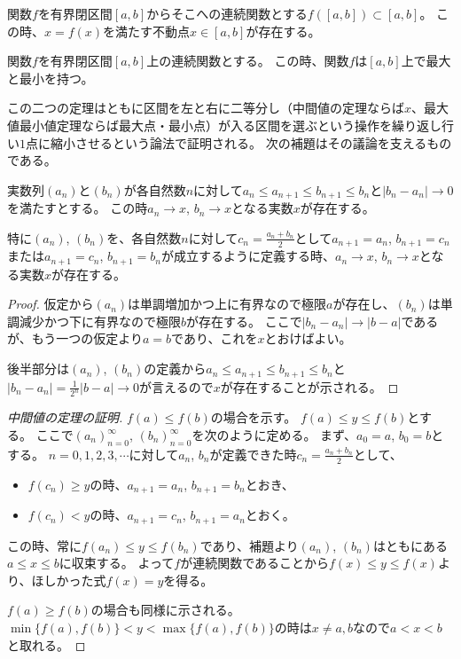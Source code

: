 \begin{corollary}[不動点型の中間値の定理]
関数$f$を有界閉区間$[a, b]$からそこへの連続関数とする$f([a, b]) \subset [a, b]$。
この時、$x = f(x)$を満たす不動点$x \in [a, b]$が存在する。
\end{corollary}

\begin{theorem}[最大値最小値定理]
関数$f$を有界閉区間$[a, b]$上の連続関数とする。
この時、関数$f$は$[a, b]$上で最大と最小を持つ。
\end{theorem}

この二つの定理はともに区間を左と右に二等分し（中間値の定理ならば$x$、最大値最小値定理ならば最大点・最小点）が入る区間を選ぶという操作を繰り返し行い$1$点に縮小させるという論法で証明される。
次の補題はその議論を支えるものである。

\begin{lemma}[区間縮小法]
実数列$(a_n)$と$(b_n)$が各自然数$n$に対して$a_n \le a_{n+1} \le b_{n+1} \le b_n$と$|b_n-a_n| \to 0$を満たすとする。
この時$a_n \to x$, $b_n \to x$となる実数$x$が存在する。

特に$(a_n)$, $(b_n)$を、各自然数$n$に対して$c_n = \frac{a_n+b_n}{2}$として$a_{n+1} = a_n$, $b_{n+1} = c_n$または$a_{n+1} = c_n$, $b_{n+1} = b_n$が成立するように定義する時、$a_n \to x$, $b_n \to x$となる実数$x$が存在する。
\end{lemma}

\begin{proof}
仮定から$(a_n)$は単調増加かつ上に有界なので極限$a$が存在し、$(b_n)$は単調減少かつ下に有界なので極限$b$が存在する。
ここで$|b_n-a_n| \to |b-a|$であるが、もう一つの仮定より$a = b$であり、これを$x$とおけばよい。

後半部分は$(a_n)$, $(b_n)$の定義から$a_n \le a_{n+1} \le b_{n+1} \le b_n$と$|b_n-a_n| = \frac{1}{2^n}|b-a| \to 0$が言えるので$x$が存在することが示される。
\end{proof}

\begin{proof}[中間値の定理の証明]
$f(a) \le f(b)$の場合を示す。
$f(a) \le y \le f(b)$とする。
ここで$(a_n)_{n = 0}^\infty$, $(b_n)_{n = 0}^\infty$を次のように定める。
まず、$a_0 = a$, $b_0 = b$とする。
$n = 0, 1, 2, 3, \cdots$に対して$a_n$, $b_n$が定義できた時$c_n = \frac{a_n+b_n}{2}$として、
\begin{itemize}
\item
$f(c_n) \ge y$の時、$a_{n+1} = a_n$, $b_{n+1} = b_n$とおき、
\item
$f(c_n) < y$の時、$a_{n+1} = c_n$, $b_{n+1} = a_n$とおく。
\end{itemize}
この時、常に$f(a_n) \le y \le f(b_n)$であり、補題より$(a_n)$, $(b_n)$はともにある$a \le x \le b$に収束する。
よって$f$が連続関数であることから$f(x) \le y \le f(x)$より、ほしかった式$f(x) = y$を得る。

$f(a) \ge f(b)$の場合も同様に示される。
$\min\{ f(a), f(b) \} < y < \max\{ f(a), f(b) \}$の時は$x \ne a, b$なので$a < x < b$と取れる。
\end{proof}

